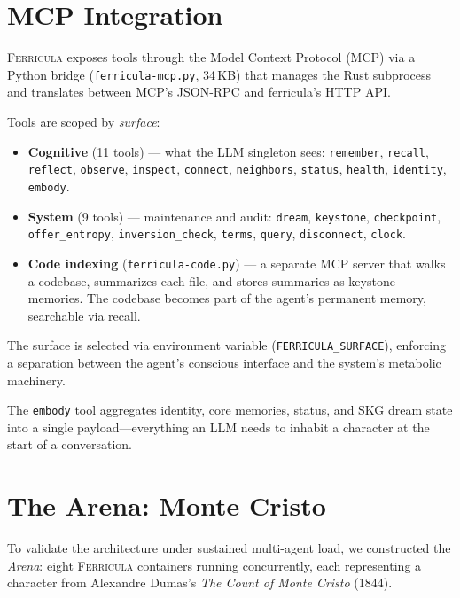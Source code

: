 \documentclass[twocolumn,10pt]{article}
\begin{document}
\section{MCP Integration}

\textsc{Ferricula} exposes tools through the Model Context Protocol
(MCP) via a Python bridge (\texttt{ferricula-mcp.py}, 34\,KB) that
manages the Rust subprocess and translates between MCP's JSON-RPC
and ferricula's HTTP API.

Tools are scoped by \textit{surface}:

\begin{itemize}[leftmargin=*,itemsep=1pt]
\item \textbf{Cognitive} (11 tools) --- what the LLM singleton sees:
  \texttt{remember}, \texttt{recall}, \texttt{reflect}, \texttt{observe},
  \texttt{inspect}, \texttt{connect}, \texttt{neighbors}, \texttt{status},
  \texttt{health}, \texttt{identity}, \texttt{embody}.
\item \textbf{System} (9 tools) --- maintenance and audit:
  \texttt{dream}, \texttt{keystone}, \texttt{checkpoint},
  \texttt{offer\_entropy}, \texttt{inversion\_check}, \texttt{terms},
  \texttt{query}, \texttt{disconnect}, \texttt{clock}.
\item \textbf{Code indexing} (\texttt{ferricula-code.py}) --- a
  separate MCP server that walks a codebase, summarizes each file,
  and stores summaries as keystone memories.  The codebase becomes
  part of the agent's permanent memory, searchable via recall.
\end{itemize}

\noindent
The surface is selected via environment variable
(\texttt{FERRICULA\_SURFACE}), enforcing a separation between the
agent's conscious interface and the system's metabolic machinery.

The \texttt{embody} tool aggregates identity, core memories, status,
and SKG dream state into a single payload---everything an LLM needs
to inhabit a character at the start of a conversation.

\section{The Arena: Monte Cristo}

To validate the architecture under sustained multi-agent load, we
constructed the \textit{Arena}: eight \textsc{Ferricula} containers
running concurrently, each representing a character from Alexandre
Dumas's \textit{The Count of Monte Cristo} (1844).
\end{document}
